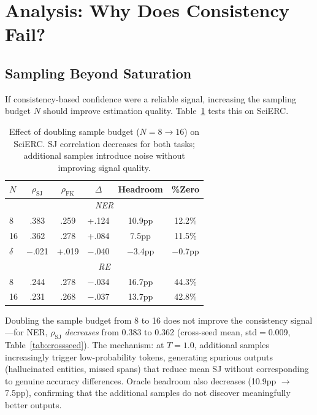 \documentclass[11pt,a4paper]{article}
\begin{document}
\section{Analysis: Why Does Consistency Fail?}
\label{sec:analysis}

\subsection{Sampling Beyond Saturation}

If consistency-based confidence were a reliable signal, increasing the sampling budget $N$ should improve estimation quality.
Table~\ref{tab:nscaling} tests this on SciERC.

\begin{table}[t]
\centering
\small
\begin{tabular}{lccccc}
\toprule
$N$ & $\rho_{\text{SJ}}$ & $\rho_{\text{FK}}$ & $\Delta$ & Headroom & \%Zero \\
\midrule
\multicolumn{6}{c}{\emph{NER}} \\
8 & .383 & .259 & +.124 & 10.9pp & 12.2\% \\
16 & .362 & .278 & +.084 & 7.5pp & 11.5\% \\
$\delta$ & $-$.021 & +.019 & $-$.040 & $-$3.4pp & $-$0.7pp \\
\midrule
\multicolumn{6}{c}{\emph{RE}} \\
8 & .244 & .278 & $-$.034 & 16.7pp & 44.3\% \\
16 & .231 & .268 & $-$.037 & 13.7pp & 42.8\% \\
\bottomrule
\end{tabular}
\caption{Effect of doubling sample budget ($N{=}8 \to 16$) on SciERC. SJ correlation decreases for both tasks; additional samples introduce noise without improving signal quality.}
\label{tab:nscaling}
\end{table}

Doubling the sample budget from 8 to 16 does not improve the consistency signal---for NER, $\rho_{\text{SJ}}$ \emph{decreases} from 0.383 to 0.362 (cross-seed mean, std$=$0.009, Table~\ref{tab:crossseed}).
The mechanism: at $T{=}1.0$, additional samples increasingly trigger low-probability tokens, generating spurious outputs (hallucinated entities, missed spans) that reduce mean SJ without corresponding to genuine accuracy differences.
Oracle headroom also decreases (10.9pp $\to$ 7.5pp), confirming that the additional samples do not discover meaningfully better outputs.
\end{document}
